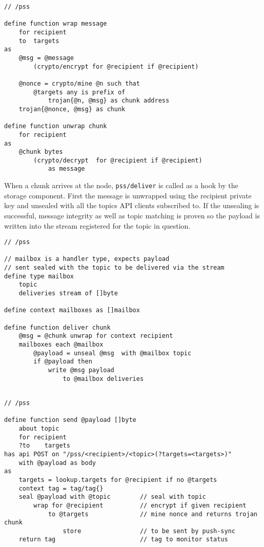 \begin{definition}\label{def:wrap}
\begin{lstlisting}[language=buzz1]
// /pss

define function wrap message 
    for recipient
    to  targets
as 
    @msg = @message 
        (crypto/encrypt for @recipient if @recipient) 

    @nonce = crypto/mine @n such that
        @targets any is prefix of
            trojan{@n, @msg} as chunk address 
    trojan{@nonce, @msg} as chunk 

define function unwrap chunk
    for recipient
as
    @chunk bytes 
        (crypto/decrypt  for @recipient if @recipient)
            as message

\end{lstlisting}
\end{definition}

When a chunk arrives at the node,  \lstinline{pss/deliver} is called as a hook by the storage component.
First the message is unwrapped using the recipient private key and unsealed with all the topics API clients subscribed to. If the unsealing is successful, message integrity as well as topic matching is proven so the payload is written into the stream registered for the topic in question.

\begin{definition}\label{def:delivery}
\begin{lstlisting}[language=buzz1]
// /pss

// mailbox is a handler type, expects payload
// sent sealed with the topic to be delivered via the stream 
define type mailbox
    topic
    deliveries stream of []byte 
    
define context mailboxes as []mailbox

define function deliver chunk
    @msg = @chunk unwrap for context recipient
    mailboxes each @mailbox 
        @payload = unseal @msg  with @mailbox topic
        if @payload then 
            write @msg payload 
                to @mailbox deliveries 
    

\end{lstlisting}
\end{definition}


\begin{definition}\label{def:send}
\begin{lstlisting}[language=buzz1]
// /pss

define function send @payload []byte
    about topic
    for recipient
    ?to    targets
has api POST on "/pss/<recipient>/<topic>(?targets=<targets>)"
    with @payload as body
as 
    targets = lookup.targets for @recipient if no @targets
    context tag = tag/tag{}
    seal @payload with @topic        // seal with topic
        wrap for @recipient          // encrypt if given recipient
            to @targets              // mine nonce and returns trojan chunk
                store                // to be sent by push-sync
    return tag                       // tag to monitor status 
    
\end{lstlisting}
\end{definition}

